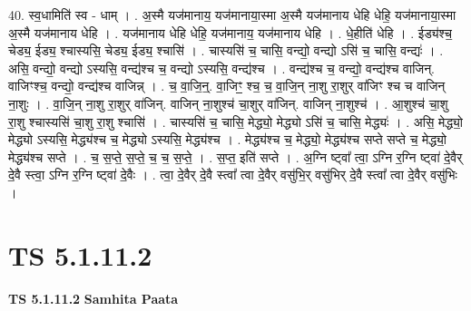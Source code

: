 \documentclass[17pt]{extarticle}
\begin{document}
40. स्व॒धामिति॑ स्व - धाम् । . अ॒स्मै यज॑मानाय॒ यज॑मानाया॒स्मा अ॒स्मै यज॑मानाय धेहि धेहि॒ यज॑मानाया॒स्मा अ॒स्मै यज॑मानाय धेहि । . यज॑मानाय धेहि धेहि॒ यज॑मानाय॒ यज॑मानाय धेहि । . धे॒हीति॑ धेहि । . ईड्य॑श्च॒ चेड्य॒ ईड्य॒ श्चास्यसि॒ चेड्य॒ ईड्य॒ श्चासि॑ । . चास्यसि॑ च॒ चासि॒ वन्द्यो॒ वन्द्यो ऽसि॑ च॒ चासि॒ वन्द्यः॑ । . असि॒ वन्द्यो॒ वन्द्यो ऽस्यसि॒ वन्द्य॑श्च च॒ वन्द्यो ऽस्यसि॒ वन्द्य॑श्च । . वन्द्य॑श्च च॒ वन्द्यो॒ वन्द्य॑श्च वाजिन्. वाजिꣳश्च॒ वन्द्यो॒ वन्द्य॑श्च वाजिन्न् । . च॒ वा॒जि॒न्॒. वा॒जिꣳ॒॒ श्च॒ च॒ वा॒जि॒न् ना॒शु रा॒शुर् वा॑जिꣳ श्च च वाजिन् ना॒शुः । . वा॒जि॒न् ना॒शु रा॒शुर् वा॑जिन्. वाजिन् ना॒शुश्च॑ चा॒शुर् वा॑जिन्. वाजिन् ना॒शुश्च॑ । . आ॒शुश्च॑ चा॒शु रा॒शु श्चास्यसि॑ चा॒शु रा॒शु श्चासि॑ । . चास्यसि॑ च॒ चासि॒ मेद्ध्यो॒ मेद्ध्यो ऽसि॑ च॒ चासि॒ मेद्ध्यः॑ । . असि॒ मेद्ध्यो॒ मेद्ध्यो ऽस्यसि॒ मेद्ध्य॑श्च च॒ मेद्ध्यो ऽस्यसि॒ मेद्ध्य॑श्च । . मेद्ध्य॑श्च च॒ मेद्ध्यो॒ मेद्ध्य॑श्च सप्ते सप्ते च॒ मेद्ध्यो॒ मेद्ध्य॑श्च सप्ते । . च॒ स॒प्ते॒ स॒प्ते॒ च॒ च॒ स॒प्ते॒ । . स॒प्त॒ इति॑ सप्ते । . अ॒ग्नि ष्ट्वा᳚ त्वा॒ ऽग्नि र॒ग्नि ष्ट्वा॑ दे॒वैर् दे॒वै स्त्वा॒ ऽग्नि र॒ग्नि ष्ट्वा॑ दे॒वैः । . त्वा॒ दे॒वैर् दे॒वै स्त्वा᳚ त्वा दे॒वैर् वसु॑भि॒र् वसु॑भिर् दे॒वै स्त्वा᳚ त्वा दे॒वैर् वसु॑भिः । \newline
\pagebreak
{}

\section{ TS 5.1.11.2 }

\textbf{TS 5.1.11.2 } \newline
\textbf{Samhita Paata} \newline
\end{document}

